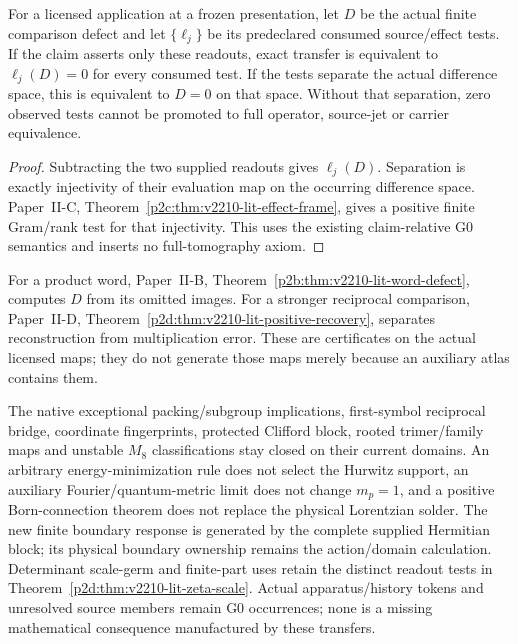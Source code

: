 \documentclass[12pt,a4paper]{article}
\begin{document}
\begin{corollary}
\label{p2a:cor:v2210-lit-visible-defect}
For a licensed application at a frozen presentation, let $D$ be the actual
finite comparison defect and let $\{\ell_j\}$ be its predeclared consumed
source/effect tests.  If the claim asserts only these readouts, exact
transfer is equivalent to $\ell_j(D)=0$ for every consumed test.
If the tests separate the actual difference space, this is equivalent to
$D=0$ on that space.  Without that separation, zero observed tests cannot
be promoted to full operator, source-jet or carrier equivalence.
\end{corollary}
\begin{proof}
Subtracting the two supplied readouts gives $\ell_j(D)$.  Separation is
exactly injectivity of their evaluation map on the occurring difference
space.  Paper~II-C, Theorem~\ref{p2c:thm:v2210-lit-effect-frame}, gives a
positive finite Gram/rank test for that injectivity.  This uses the
existing claim-relative G0 semantics and inserts no full-tomography axiom.
\end{proof}
For a product word, Paper~II-B,
Theorem~\ref{p2b:thm:v2210-lit-word-defect}, computes $D$ from its omitted
images.  For a stronger reciprocal comparison, Paper~II-D,
Theorem~\ref{p2d:thm:v2210-lit-positive-recovery}, separates reconstruction
from multiplication error.  These are certificates on the actual licensed
maps; they do not generate those maps merely because an auxiliary atlas
contains them.

\begin{remark}
\label{p2a:rem:v2210-lit-retained-frontier}
The native exceptional packing/subgroup implications, first-symbol
reciprocal bridge, coordinate fingerprints, protected Clifford block,
rooted trimer/family maps and unstable $M_8$ classifications stay closed
on their current domains.  An arbitrary energy-minimization rule does not
select the Hurwitz support, an auxiliary Fourier/quantum-metric limit does
not change $m_p=1$, and a positive Born-connection theorem does not replace
the physical Lorentzian solder.  The new finite boundary response is
generated by the complete supplied Hermitian block; its physical boundary
ownership remains the action/domain calculation.  Determinant scale-germ
and finite-part uses retain the distinct readout tests in
Theorem~\ref{p2d:thm:v2210-lit-zeta-scale}.  Actual apparatus/history tokens
and unresolved source members remain G0 occurrences; none is a missing
mathematical consequence manufactured by these transfers.
\end{remark}
\end{document}
